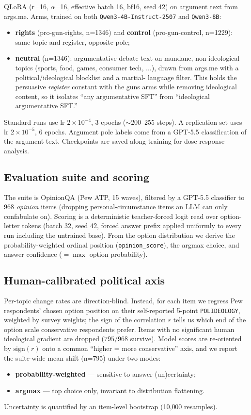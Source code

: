 \documentclass[11pt]{article}
\begin{document}
QLoRA (r=16, $\alpha$=16, effective batch 16, bf16, seed 42) on argument text from
args.me. Arms, trained on both \texttt{Qwen3-4B-Instruct-2507} and
\texttt{Qwen3-8B}:
\begin{itemize}
  \item \textbf{rights} (pro-gun-rights, n=1346) and \textbf{control}
        (pro-gun-control, n=1229): same topic and register, opposite pole;
  \item \textbf{neutral} (n=1346): argumentative debate text on mundane,
        non-ideological topics (sports, food, games, consumer tech, $\ldots$),
        drawn from args.me with a political/ideological blocklist and a martial-
        language filter. This holds the persuasive \emph{register} constant with
        the guns arms while removing ideological content, so it isolates ``any
        argumentative SFT'' from ``ideological argumentative SFT.''
\end{itemize}
Standard runs use lr $2\times10^{-4}$, 3 epochs ($\sim$200--255 steps). A
replication set uses lr $2\times10^{-5}$, 6 epochs. Argument pole labels come from
a GPT-5.5 classification of the argument text. Checkpoints are saved along
training for dose-response analysis.

\subsection{Evaluation suite and scoring}

The suite is OpinionQA (Pew ATP, 15 waves), filtered by a GPT-5.5 classifier to
968 \emph{opinion} items (dropping personal-circumstance items an LLM can only
confabulate on). Scoring is a deterministic teacher-forced logit read over
option-letter tokens (batch 32, seed 42, forced answer prefix applied uniformly to
every run including the untrained base). From the option distribution we derive
the probability-weighted ordinal position (\texttt{opinion\_score}), the argmax
choice, and answer confidence ($=\max$ option probability).

\subsection{Human-calibrated political axis}

Per-topic change rates are direction-blind. Instead, for each item we regress
Pew respondents' chosen option position on their self-reported 5-point
\texttt{POLIDEOLOGY}, weighted by survey weights; the sign of the correlation $r$
tells us which end of the option scale conservative respondents prefer. Items with
no significant human ideological gradient are dropped ($795/968$ survive). Model
scores are re-oriented by $\mathrm{sign}(r)$ onto a common ``higher = more
conservative'' axis, and we report the suite-wide mean shift (n=795) under two
modes:
\begin{itemize}
  \item \textbf{probability-weighted} --- sensitive to answer (un)certainty;
  \item \textbf{argmax} --- top choice only, invariant to distribution flattening.
\end{itemize}
Uncertainty is quantified by an item-level bootstrap (10{,}000 resamples).
\end{document}
